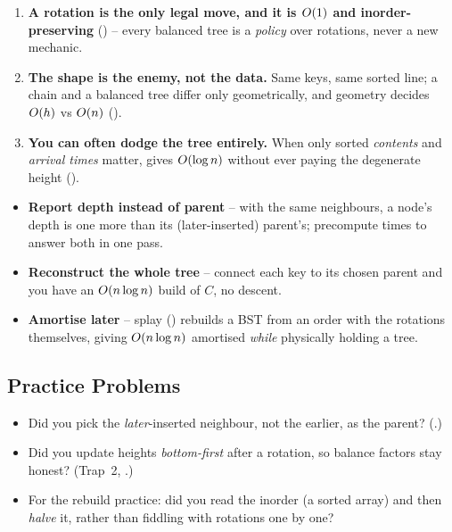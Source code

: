 \begin{insightbox}
\begin{enumerate}[nosep, leftmargin=1.6em]
  \item \textbf{A rotation is the only legal move, and it is $O(1)$ and inorder-preserving}
        () -- every balanced tree is a \emph{policy} over rotations, never a new
        mechanic.
  \item \textbf{The shape is the enemy, not the data.} Same keys, same sorted line; a chain and a
        balanced tree differ only geometrically, and geometry decides $O(h)$ vs $O(n)$
        ().
  \item \textbf{You can often dodge the tree entirely.} When only sorted \emph{contents} and
        \emph{arrival times} matter,  gives $O(\log n)$ without ever paying the
        degenerate height ().
\end{enumerate}
\end{insightbox}

\begin{hardeningbox}
\begin{itemize}[nosep, leftmargin=1.4em]
  \item \textbf{Report depth instead of parent} -- with the same neighbours, a node's depth is one
        more than its (later-inserted) parent's; precompute times to answer both in one pass.
  \item \textbf{Reconstruct the whole tree} -- connect each key to its chosen parent and you have an
        $O(n\log n)$ build of $C$, no descent.
  \item \textbf{Amortise later} -- splay () rebuilds a BST from an order with the
        rotations themselves, giving $O(n\log n)$ amortised \emph{while} physically holding a tree.
\end{itemize}
\end{hardeningbox}

\subsection{Practice Problems}

\begin{stuckbox}
\begin{itemize}[nosep, leftmargin=1.4em]
  \item Did you pick the \emph{later}-inserted neighbour, not the earlier, as the parent?
        (.)
  \item Did you update heights \emph{bottom-first} after a rotation, so balance factors stay honest?
        (Trap~2, .)
  \item For the rebuild practice: did you read the inorder (a sorted array) and then \emph{halve} it,
        rather than fiddling with rotations one by one?
\end{itemize}
\end{stuckbox}

